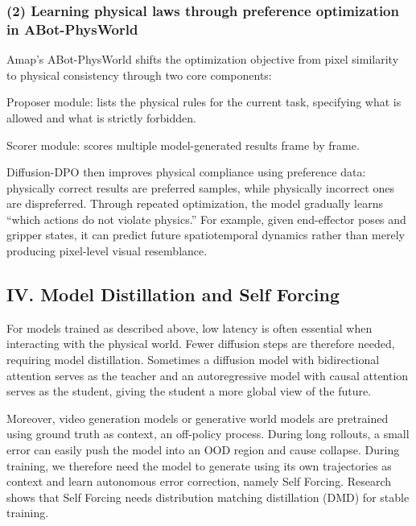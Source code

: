 \hypertarget{learning-physical-laws-through-preference-optimization-in-abot-physworld}{%
\subsubsection{(2) Learning physical laws through preference optimization in ABot-PhysWorld}\label{learning-physical-laws-through-preference-optimization-in-abot-physworld}}

Amap's ABot-PhysWorld shifts the optimization objective from pixel similarity to physical consistency through two core components:

Proposer module: lists the physical rules for the current task, specifying what is allowed and what is strictly forbidden.

Scorer module: scores multiple model-generated results frame by frame.

Diffusion-DPO then improves physical compliance using preference data: physically correct results are preferred samples, while physically incorrect ones are dispreferred. Through repeated optimization, the model gradually learns ``which actions do not violate physics.'' For example, given end-effector poses and gripper states, it can predict future spatiotemporal dynamics rather than merely producing pixel-level visual resemblance.

\hypertarget{iv.-model-distillation-and-self-forcing}{%
\subsection{IV. Model Distillation and Self Forcing}\label{iv.-model-distillation-and-self-forcing}}

For models trained as described above, low latency is often essential when interacting with the physical world. Fewer diffusion steps are therefore needed, requiring model distillation. Sometimes a diffusion model with bidirectional attention serves as the teacher and an autoregressive model with causal attention serves as the student, giving the student a more global view of the future.

Moreover, video generation models or generative world models are pretrained using ground truth as context, an off-policy process. During long rollouts, a small error can easily push the model into an OOD region and cause collapse. During training, we therefore need the model to generate using its own trajectories as context and learn autonomous error correction, namely Self Forcing. Research shows that Self Forcing needs distribution matching distillation (DMD) for stable training.

